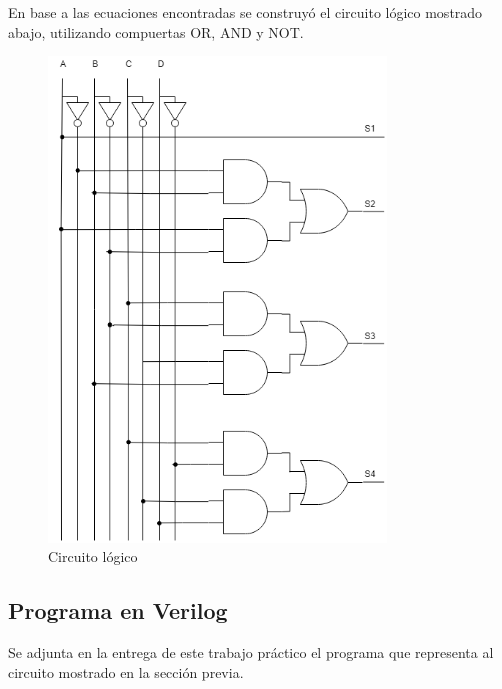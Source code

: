 En base a las ecuaciones encontradas se construy\'o el circuito l\'ogico mostrado abajo, utilizando compuertas \textsc{OR}, \textsc{AND} y \textsc{NOT}.

\begin{figure}[H]
    \centering
    \includegraphics[width=0.8\textwidth]{./EJ_4/EJ4_TP1_Electro3.png}
    \caption{Circuito l\'ogico}
\end{figure}

\subsection{Programa en Verilog}
Se adjunta en la entrega de este trabajo pr\'actico el programa que representa al circuito mostrado en la secci\'on previa.
